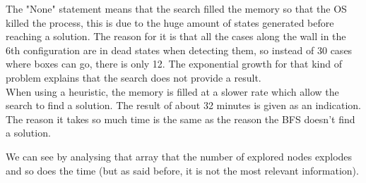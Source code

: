 \documentclass[a4paper,10pt]{article}
\begin{document}
			The "None" statement means that the search filled the memory so that the OS killed the process, this is due to the huge amount of states generated before reaching a solution. The reason for it is that all the cases along the wall in the 6th configuration are in dead states when detecting them, so instead of 30 cases where boxes can go, there is only 12. The exponential growth for that kind of problem explains that the search does not provide a result.\\
			When using a heuristic, the memory is filled at a slower rate which allow the search to find a solution. The result of about 32 minutes is given as an indication.\\
			The reason it takes so much time is the same as the reason the BFS doesn't find a solution.
			
			We can see by analysing that array that the number of explored nodes explodes and so does the time (but as said before, it is not the most relevant information).
			
\end{document}
